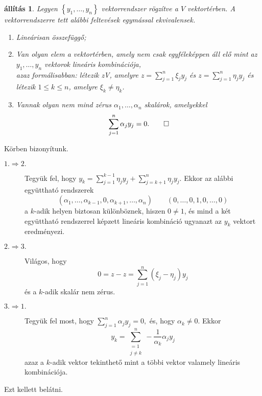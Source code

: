 \documentclass[9pt, a4paper, showtrims]{memoir}
\makeatletter
\renewenvironment{proof}[1][\proofname]
    {\par\pushQED{\qed}%
    \normalfont \topsep6\p@\@plus6\p@\relax
    \trivlist
    \item[\hskip\labelsep
        \itshape
    #1\@addpunct{:}]\ignorespaces}
    {\popQED\endtrivlist\@endpefalse}
\theoremstyle{plain}
\newtheorem{proposition}{állítás}[chapter]
\theoremstyle{remark}
\theoremstyle{definition}
\makeatother
\begin{document}
\begin{proposition}
    Legyen $\left\{ y_1,\dots,y_n \right\}$ vektorrendszer rögzítve a $V$ vektortérben.
    A vektorrendszerre tett alábbi feltevések egymással ekvivalensek.
    \begin{enumerate}
        \item Lineárisan összefüggő;
        \item Van olyan elem a vektortérben, amely nem csak egyféleképpen áll elő mint az $y_1,\dots,y_n$
            vektorok lineáris kombinációja,\\
            azaz formálisabban:
            létezik z\in V, amelyre $z=\sum_{j=1}^n\xi_jy_j$ és $z=\sum_{j=1}^n\eta_jy_j$
            és létezik $1\leq k\leq n$, amelyre $\xi_k\neq\eta_k$.
        \item Vannak olyan nem mind zérus $\alpha_1,\dots,\alpha_n$ skalárok, amelyekkel
            \[
                \sum_{j=1}^n\alpha_jy_j=0.\qedhere
            \]
    \end{enumerate}
\end{proposition}
\begin{proof}
    Körben bizonyítunk.
    \begin{description}
        \item[$1.\Rightarrow 2.$] 
            Tegyük fel, hogy $y_k=\sum_{j=1}^{k-1}\eta_jy_j+\sum_{j=k+1}^n\eta_jy_j$.
            Ekkor az alábbi együttható rendszerek
            \[
                \left( \alpha_1,\dots,\alpha_{k-1},0,\alpha_{k+1},\dots,\alpha_n \right)
                \qquad
                \left( 0,\dots,0,1,0,\dots,0 \right)
            \]
            a $k$-adik helyen biztosan különböznek, 
            hiszen $0\neq 1$, 
            és mind a két együttható rendszerrel képzett lineáris kombináció ugyanazt az $y_k$ vektort eredményezi.
        \item[$2.\Rightarrow 3.$]
            Világos, hogy 
            \[
                0=z-z=
                \sum_{j=1}^n\left( \xi_j-\eta_j \right)y_j
            \]
            és a $k$-adik skalár nem zérus.
        \item[$3.\Rightarrow 1.$]
            Tegyük fel most, hogy 
            \(
            \sum_{j=1}^n\alpha_jy_j=0,
            \)
            és, hogy $\alpha_k\neq 0.$
            Ekkor 
            \[
                y_k=\sum_{\substack{=1\\j\neq k}}^n-\frac{1}{\alpha_k}\alpha_jy_j
            \]
            azaz a $k$-adik vektor tekinthető mint a többi vektor valamely lineáris kombinációja.
    \end{description}
    Ezt kellett belátni. 
\end{proof}
\end{document}
